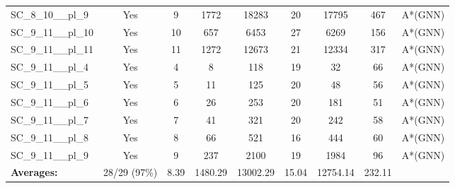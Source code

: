 \documentclass{article}
\begin{document}
\begin{tabular}{lcccccccc}
SC\_8\_10\_\_pl\_9 & Yes & 9 & 1772 & 18283 & 20 & 17795 & 467 & A*(GNN) \\
SC\_9\_11\_\_pl\_10 & Yes & 10 & 657 & 6453 & 27 & 6269 & 156 & A*(GNN) \\
SC\_9\_11\_\_pl\_11 & Yes & 11 & 1272 & 12673 & 21 & 12334 & 317 & A*(GNN) \\
SC\_9\_11\_\_pl\_4 & Yes & 4 & 8 & 118 & 19 & 32 & 66 & A*(GNN) \\
SC\_9\_11\_\_pl\_5 & Yes & 5 & 11 & 125 & 20 & 48 & 56 & A*(GNN) \\
SC\_9\_11\_\_pl\_6 & Yes & 6 & 26 & 253 & 20 & 181 & 51 & A*(GNN) \\
SC\_9\_11\_\_pl\_7 & Yes & 7 & 41 & 321 & 20 & 242 & 58 & A*(GNN) \\
SC\_9\_11\_\_pl\_8 & Yes & 8 & 66 & 521 & 16 & 444 & 60 & A*(GNN) \\
SC\_9\_11\_\_pl\_9 & Yes & 9 & 237 & 2100 & 19 & 1984 & 96 & A*(GNN) \\
\textbf{Averages:} & 28/29 (97\%) & 8.39 & 1480.29 & 13002.29 & 15.04 & 12754.14 & 232.11 & \\
\bottomrule
\end{tabular}
\\[0.7cm]
\end{document}
